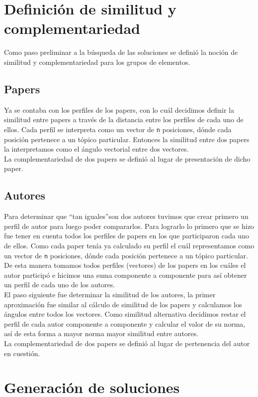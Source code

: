 \section{Definición de similitud y complementariedad}
Como paso preliminar a la búsqueda de las soluciones se definió la noción de similitud y 
complementariedad para los grupos de elementos.
\subsection{Papers}
Ya se contaba con los perfiles de los papers, con lo cuál decidimos definir la similitud entre 
papers a través de la distancia entre los perfiles de cada uno de ellos. Cada perfil se interpreta 
como un vector de \texttt{n} posiciones, dónde cada posición pertenece a un tópico particular. 
Entonces la similitud entre dos papers la interpretamos como el ángulo vectorial entre dos 
vectores.\\
La complementariedad de dos papers se definió al lugar de presentación de dicho paper.
\subsection{Autores}
Para determinar que \textquotedblleft tan iguales\textquotedblright son dos autores tuvimos que 
crear primero un perfil de autor para luego poder compararlos. Para lograrlo lo primero que se hizo 
fue tener en cuenta todos los perfiles de papers en los que participaron cada uno de ellos. Como 
cada paper tenía ya calculado su perfil el cuál representamos como un vector de \texttt{n} 
posiciones, dónde cada posición pertenece a un tópico particular. De esta manera tomamos todos 
perfiles (vectores) de los papers en los cuáles el autor participó e hicimos una suma componente a 
componente para así obtener un perfil de cada uno de los autores.\\
El paso siguiente fue determinar la similitud de los autores, la primer aproximación fue similar al 
cálculo de similitud de los papers y calculamos los ángulos entre todos los vectores. Como similitud
alternativa decidimos restar el perfil de cada autor componente a componente y calcular el valor de 
su norma, así de esta forma a mayor norma mayor similitud entre autores.\\
La complementariedad de dos papers se definió al lugar de pertenencia del autor en cuestión.
\section{Generación de soluciones}

